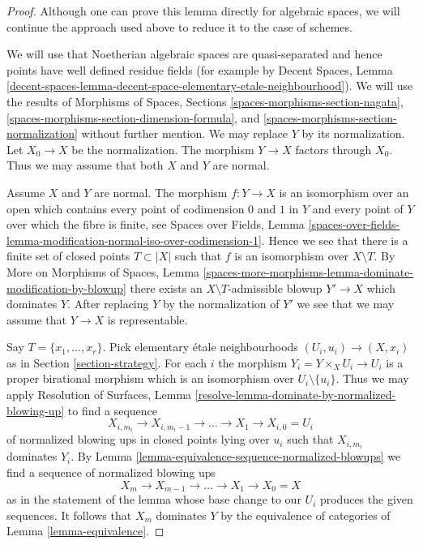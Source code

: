 \begin{proof}
Although one can prove this lemma directly for algebraic spaces,
we will continue the approach used above to reduce it to the case
of schemes.

\medskip\noindent
We will use that Noetherian algebraic spaces are quasi-separated
and hence points have well defined residue fields (for example by
Decent Spaces, Lemma
\ref{decent-spaces-lemma-decent-space-elementary-etale-neighbourhood}).
We will use the results of Morphisms of Spaces, Sections
\ref{spaces-morphisms-section-nagata},
\ref{spaces-morphisms-section-dimension-formula}, and
\ref{spaces-morphisms-section-normalization} without further mention.
We may replace $Y$ by its normalization. Let $X_0 \to X$ be the normalization.
The morphism $Y \to X$ factors through $X_0$.
Thus we may assume that both $X$ and $Y$ are normal.

\medskip\noindent
Assume $X$ and $Y$ are normal. The morphism $f : Y \to X$ is an isomorphism
over an open which contains every point of codimension $0$ and $1$ in $Y$ and
every point of $Y$ over which the fibre is finite, see
Spaces over Fields, Lemma
\ref{spaces-over-fields-lemma-modification-normal-iso-over-codimension-1}.
Hence we see that there is a finite set of closed points $T \subset |X|$
such that $f$ is an isomorphism over $X \setminus T$.
By More on Morphisms of Spaces, Lemma
\ref{spaces-more-morphisms-lemma-dominate-modification-by-blowup}
there exists an $X \setminus T$-admissible blowup $Y' \to X$
which dominates $Y$. After replacing $Y$ by the normalization of
$Y'$ we see that we may assume that $Y \to X$ is representable.

\medskip\noindent
Say $T = \{x_1, \ldots, x_r\}$. Pick elementary \'etale neighbourhoods
$(U_i, u_i) \to (X, x_i)$ as in Section \ref{section-strategy}.
For each $i$ the morphism $Y_i = Y \times_X U_i \to U_i$
is a proper birational morphism which is an isomorphism over
$U_i \setminus \{u_i\}$. Thus we may apply
Resolution of Surfaces, Lemma
\ref{resolve-lemma-dominate-by-normalized-blowing-up}
to find a sequence
$$
X_{i, m_i} \to X_{i, m_i - 1} \to \ldots \to X_1 \to X_{i, 0} = U_i
$$
of normalized blowing ups in closed points lying over $u_i$ such that
$X_{i, m_i}$ dominates $Y_i$.
By Lemma \ref{lemma-equivalence-sequence-normalized-blowups}
we find a sequence of normalized blowing ups
$$
X_m \to X_{m - 1} \to \ldots \to X_1 \to X_0 = X
$$
as in the statement of the lemma whose base change to our $U_i$
produces the given sequences. It follows that $X_m$ dominates
$Y$ by the equivalence of categories of
Lemma \ref{lemma-equivalence}.
\end{proof}















